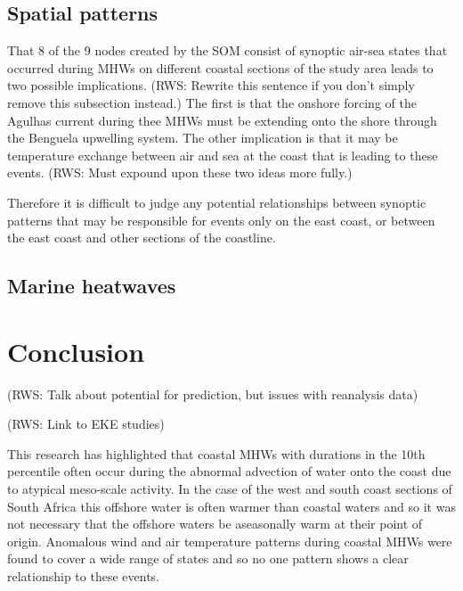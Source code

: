 \documentclass[a4paper,10pt,review]{elsarticle}
\begin{document}
\subsection{Spatial patterns}
That 8 of the 9 nodes created by the SOM consist of synoptic air-sea states that occurred during MHWs on different coastal sections of the study area leads to two possible implications. (RWS: Rewrite this sentence if you don't simply remove this subsection instead.) The first is that the onshore forcing of the Agulhas current during thee MHWs must be extending onto the shore through the Benguela upwelling system. The other implication is that it may be temperature exchange between air and sea at the coast that is leading to these events. (RWS: Must expound upon these two ideas more fully.)

Therefore it is difficult to judge any potential relationships between synoptic patterns that may be responsible for events only on the east coast, or between the east coast and other sections of the coastline.

\subsection{Marine heatwaves}


\section{Conclusion}

(RWS: Talk about potential for prediction, but issues with reanalysis data)

(RWS: Link to EKE studies)

This research has highlighted that coastal MHWs with durations in the 10th percentile often occur during the abnormal advection of water onto the coast due to atypical meso-scale activity. In the case of the west and south coast sections of South Africa this offshore water is often warmer than coastal waters and so it was not necessary that the offshore waters be aseasonally warm at their point of origin. Anomalous wind and air temperature patterns during coastal MHWs were found to cover a wide range of states and so no one pattern shows a clear relationship to these events.
\end{document}
